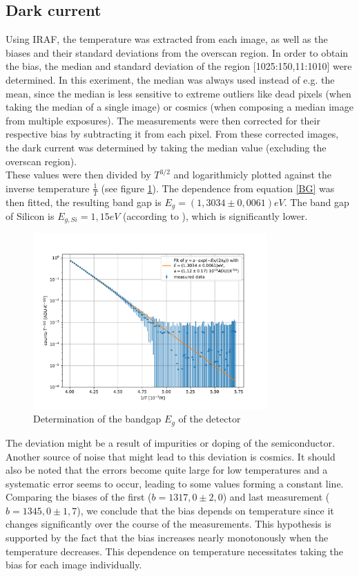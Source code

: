 \documentclass[12pt]{article}
\begin{document}
\subsection{Dark current}
	Using IRAF, the temperature was extracted from each image, as well as the biases and their standard deviations from the overscan region. In order to obtain the bias, the median and standard deviation of the region [1025:150,11:1010] were determined. In this exeriment, the median was always used instead of e.g. the mean, since the median is less sensitive to extreme outliers like dead pixels (when taking the median of a single image) or cosmics (when composing a median image from multiple exposures). The measurements were then corrected for their respective bias by subtracting it from each pixel. From these corrected images, the dark current was determined by taking the median value (excluding the overscan region).\\
	These values were then divided by $T^{3/2}$ and logarithmicly plotted against the inverse temperature $\frac{1}{T}$ (see figure \ref{bandgap}). The dependence from equation \ref{BG} was then fitted, the resulting band gap is $E_g = (1,3034 \pm 0,0061)\si{eV}$.
The band gap of Silicon is $E_{g,Si} = 1,15 \si{eV}$ (according to \cite{sc}), which is significantly lower.
\begin{figure}[H]
  \centering
  \includegraphics[width=0.8\textwidth]{figures/bandgap.pdf}

  \caption{Determination of the bandgap $E_g$ of the detector}
  \label{bandgap}          
\end{figure}
The deviation might be a result of impurities or doping of the semiconductor. Another source of noise that might lead to this deviation is cosmics. It should also be noted that the errors become quite large for low temperatures and a systematic error seems to occur, leading to some values forming a constant line.\\
Comparing the biases of the first ($b=1317,0\pm 2,0$) and last measurement ($b=1345,0\pm 1,7$), we conclude that the bias depends on temperature since it changes significantly over the course of the measurements. This hypothesis is supported by the fact that the bias increases nearly monotonously when the temperature decreases. This dependence on temperature necessitates taking the bias for each image individually.
\end{document}
